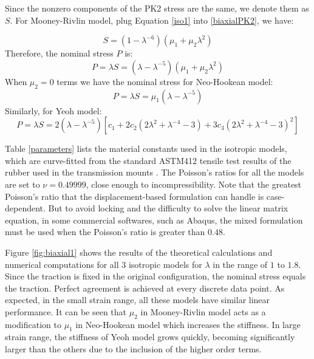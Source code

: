 Since the nonzero components of the PK2 stress are the same, we denote them as $S$. For Mooney-Rivlin model, plug Equation \ref{iso1} into \ref{biaxialPK2}, we have:

\begin{equation}
S = (1 - {\lambda}^{-6})(\mu_1 + \mu_2{\lambda}^2)
\end{equation}
Therefore, the nominal stress $P$ is:
\begin{equation}
P = \lambda S =  (\lambda - {\lambda}^{-5})(\mu_1 + \mu_2{\lambda}^2)
\end{equation}
When $\mu_2 = 0$ terms we have the nominal stress for Neo-Hookean model:
\begin{equation}
P = \lambda S =  \mu_1(\lambda - {\lambda}^{-5})
\end{equation}
Similarly, for Yeoh model:
\begin{equation}
P = \lambda S = 2(\lambda - {\lambda}^{-5})\left[c_1 + 2c_2(2{\lambda}^2 + {\lambda}^{-4} - 3) + 3c_3(2{\lambda}^2 + {\lambda}^{-4} - 3)^2\right]
\end{equation}



Table \ref{parameters} lists the material constants used in the isotropic models, which are curve-fitted from the standard ASTM412 tensile test results of the rubber used in the transmission mounts \cite{Sharma}. The Poisson's ratios for all the models are set to $\nu = 0.49999$, close enough to incompressibility. Note that the greatest Poisson's ratio that the displacement-based formulation can handle is case-dependent. But to avoid locking and the difficulty to solve the linear matrix equation, in some commercial softwares, such as Abaqus, the mixed formulation must be used when the Poisson's ratio is greater than $0.48$.

Figure \ref{fig:biaxial1} shows the results of the theoretical calculations and numerical computations for all $3$ isotropic models for $\lambda$ in the range of $1$ to $1.8$. Since the traction is fixed in the original configuration, the nominal stress equals the traction. Perfect agreement is achieved at every discrete data point. As expected, in the small strain range, all these models have similar linear performance. It can be seen that $\mu_2$ in Mooney-Rivlin model acts as a modification to $\mu_1$ in Neo-Hookean model which increases the stiffness. In large strain range, the stiffness of Yeoh model grows quickly, becoming significantly larger than the others due to the inclusion of the higher order terms.


